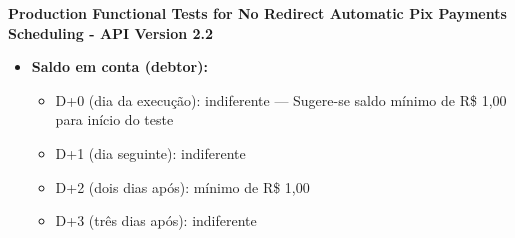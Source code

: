 \textbf{Production Functional Tests for No Redirect Automatic Pix Payments Scheduling - API Version 2.2}
\begin{itemize}
    \item \textbf{Saldo em conta (debtor):}
    \begin{itemize}
        \item D+0 (dia da execução): indiferente — Sugere-se saldo mínimo de R\$ 1,00 para início do teste
        \item D+1 (dia seguinte): indiferente
        \item D+2 (dois dias após): mínimo de R\$ 1,00
        \item D+3 (três dias após): indiferente
    \end{itemize}
\end{itemize}

